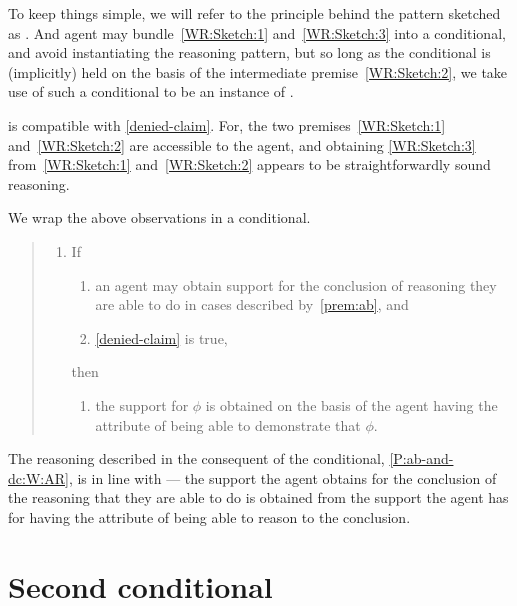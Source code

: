 \begin{note}[Attribute]
  To keep things simple, we will refer to the principle behind the pattern sketched as \AR{}.
  And agent may bundle~\ref{WR:Sketch:1} and~\ref{WR:Sketch:3} into a conditional, and avoid instantiating the reasoning pattern, but so long as the conditional is (implicitly) held on the basis of the intermediate premise~\ref{WR:Sketch:2}, we take use of such a conditional to be an instance of \AR{}.

  \AR{} is compatible with \ref{denied-claim}.
  For, the two premises~\ref{WR:Sketch:1} and~\ref{WR:Sketch:2} are accessible to the agent, and obtaining \ref{WR:Sketch:3} from~\ref{WR:Sketch:1} and~\ref{WR:Sketch:2} appears to be straightforwardly sound reasoning.
\end{note}

\begin{note}
  We wrap the above observations in a conditional.
  \begin{quote}
    \begin{enumerate}[label=(C\arabic*), ref=(C\arabic*)]
    \item\label{P:ab-and-dc:W} If
      \begin{enumerate}[label=(\alph*)]
      \item\label{P:ab-and-dc:W:ab} an agent may obtain support for the conclusion of reasoning they are able to do in cases described by~\ref{prem:ab}, and
      \item\label{P:ab-and-dc:W:uRa} \ref{denied-claim} is true,
      \end{enumerate}
      then
      \begin{enumerate}[label=(\alph*), resume]
      \item\label{P:ab-and-dc:W:AR} the support for \(\phi\) is obtained on the basis of the agent having the attribute of being able to demonstrate that \(\phi\).
      \end{enumerate}
    \end{enumerate}
  \end{quote}
  The reasoning described in the consequent of the conditional, \ref{P:ab-and-dc:W:AR}, is in line with \AR{} --- the support the agent obtains for the conclusion of the reasoning that they are able to do is obtained from the support the agent has for having the attribute of being able to reason to the conclusion.
\end{note}

\section{Second conditional}
\label{sec:second-conditional}

